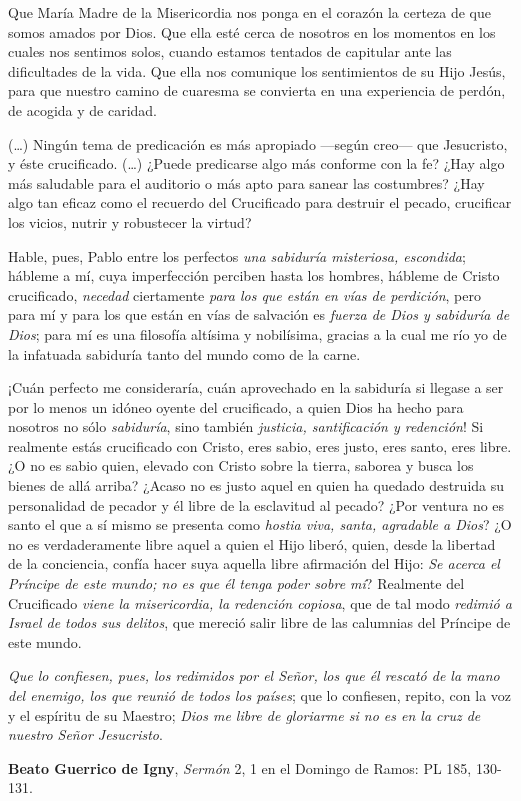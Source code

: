\begin{body}
Que María Madre de la Misericordia nos ponga en el corazón la certeza de que somos amados por Dios. Que ella esté cerca de nosotros en los momentos en los cuales nos sentimos solos, cuando estamos tentados de capitular ante las dificultades de la vida. Que ella nos comunique los sentimientos de su Hijo Jesús, para que nuestro camino de cuaresma se convierta en una experiencia de perdón, de acogida y de caridad.
\end{body}

\label{b2-03-04-2018A}

\begin{patercite}
	(\ldots) Ningún tema de predicación es más apropiado ---según creo--- que Jesucristo, y éste crucificado. (\ldots) ¿Puede predicarse algo más conforme con la fe? ¿Hay algo más saludable para el auditorio o más apto para sanear las costumbres? ¿Hay algo tan eficaz como el recuerdo del Crucificado para destruir el pecado, crucificar los vicios, nutrir y robustecer la virtud?
	
	Hable, pues, Pablo entre los perfectos \textit{una sabiduría misteriosa,	escondida}; hábleme a mí, cuya imperfección perciben hasta los hombres, hábleme de Cristo crucificado, \textit{necedad} ciertamente \textit{para los que están en	vías de perdición}, pero para mí y para los que están en vías de	salvación es \textit{fuerza de Dios y sabiduría de Dios}; para mí es una	filosofía altísima y nobilísima, gracias a la cual me río yo de la infatuada sabiduría tanto del mundo como de la carne.
	
	¡Cuán perfecto me consideraría, cuán aprovechado en la sabiduría si llegase a ser por lo menos un idóneo oyente del crucificado, a quien Dios ha hecho para nosotros no sólo \textit{sabiduría}, sino también \textit{justicia,	santificación y redención}! Si realmente estás crucificado con Cristo,	eres sabio, eres justo, eres santo, eres libre. ¿O no es sabio quien,	elevado con Cristo sobre la tierra, saborea y busca los bienes de allá	arriba? ¿Acaso no es justo aquel en quien ha quedado destruida su	personalidad de pecador y él libre de la esclavitud al pecado? ¿Por	ventura no es santo el que a sí mismo se presenta como \textit{hostia viva,	santa, agradable a Dios}? ¿O no es verdaderamente libre aquel a quien	el Hijo liberó, quien, desde la libertad de la conciencia, confía hacer	suya aquella libre afirmación del Hijo: \textit{Se acerca el Príncipe de este	mundo; no es que él tenga poder sobre mí}? Realmente del Crucificado \textit{viene la misericordia, la redención copiosa}, que de tal modo \textit{redimió a Israel de todos sus delitos}, que mereció salir libre de	las calumnias del Príncipe de este mundo.
	
	\textit{Que lo confiesen, pues, los redimidos por el Señor, los que él rescató	de la mano del enemigo, los que reunió de todos los países}; que lo confiesen, repito, con la voz y el espíritu de su Maestro; \textit{Dios me libre de gloriarme si no es en la cruz de nuestro Señor Jesucristo}.
	
	\textbf{Beato Guerrico de Igny}, \textit{Sermón} 2, 1 en el Domingo de Ramos: PL 185, 130-131.
\end{patercite}


